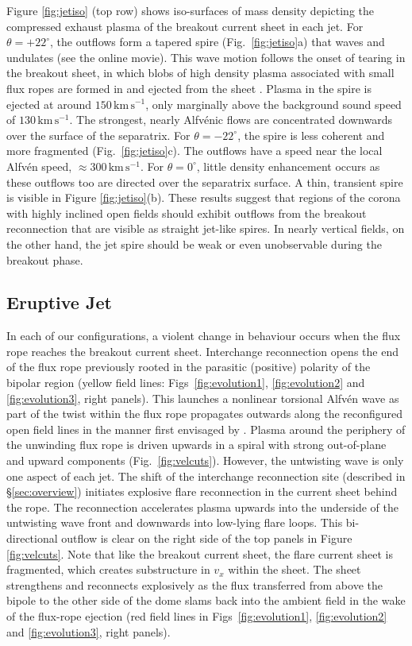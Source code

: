 \documentclass[twocolumn]{aastex6}
\begin{document}
Figure \ref{fig:jetiso} (top row) shows iso-surfaces of mass density depicting the compressed exhaust plasma of the breakout current sheet in each jet. For $\theta = +22^\circ$, the outflows form a tapered spire (Fig.\ \ref{fig:jetiso}a) that waves and undulates (see the online movie). This wave motion follows the onset of tearing in the breakout sheet, in which blobs of high density plasma associated with small flux ropes are formed in and ejected from the sheet \citep{Wyper2014b,Wyper2016b}. Plasma in the spire is ejected at around $150 \,\text{km}\,\text{s}^{-1}$, only marginally above the background sound speed of $130 \,\text{km}\,\text{s}^{-1}$. The strongest, nearly Alfv\'{e}nic flows are concentrated downwards over the surface of the separatrix. For $\theta = -22^\circ$, the spire is less coherent and more fragmented (Fig.\ \ref{fig:jetiso}c). The outflows have a speed near the local Alfv\'{e}n speed, $\approx 300 \,\text{km}\,\text{s}^{-1}$. For $\theta = 0^\circ$, little density enhancement occurs as these outflows too are directed over the separatrix surface. A thin, transient spire is visible in Figure \ref{fig:jetiso}(b). These results suggest that regions of the corona with highly inclined open fields should exhibit outflows from the breakout reconnection that are visible as straight jet-like spires. In nearly vertical fields, on the other hand, the jet spire should be weak or even unobservable during the breakout phase.

\subsection{Eruptive Jet}
\label{subsec:jet}
In each of our configurations, a violent change in behaviour occurs when the flux rope reaches the breakout current sheet. Interchange reconnection opens the end of the flux rope previously rooted in the parasitic (positive) polarity of the bipolar region (yellow field lines: Figs\ \ref{fig:evolution1}, \ref{fig:evolution2} and \ref{fig:evolution3}, right panels). This launches a nonlinear torsional Alfv\'{e}n wave as part of the twist within the flux rope propagates outwards along the reconfigured open field lines in the manner first envisaged by \citet{Shibata1986}. Plasma around the periphery of the unwinding flux rope is driven upwards in a spiral with strong out-of-plane and upward components (Fig.\ \ref{fig:velcuts}). However, the untwisting wave is only one aspect of each jet. The shift of the interchange reconnection site (described in \S \ref{sec:overview}) initiates explosive flare reconnection in the current sheet behind the rope. The reconnection accelerates plasma upwards into the underside of the untwisting wave front and downwards into low-lying flare loops. This bi-directional outflow is clear on the right side of the top panels in Figure \ref{fig:velcuts}. Note that like the breakout current sheet, the flare current sheet is fragmented, which creates substructure in $v_{x}$ within the sheet. The sheet strengthens and reconnects explosively as the flux transferred from above the bipole to the other side of the dome slams back into the ambient field in the wake of the flux-rope ejection (red field lines in Figs\ \ref{fig:evolution1}, \ref{fig:evolution2} and \ref{fig:evolution3}, right panels). 
\end{document}
